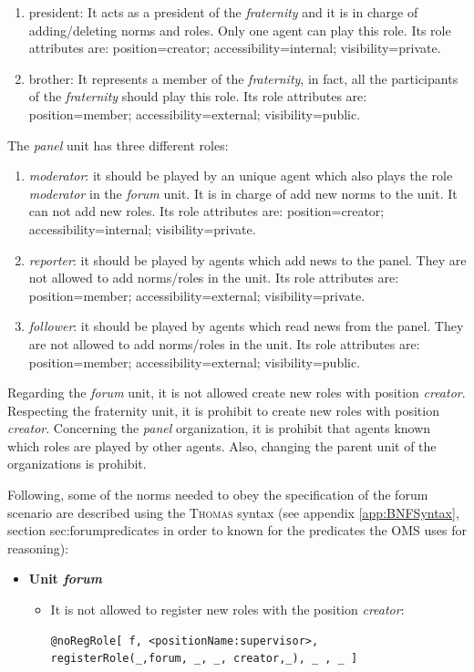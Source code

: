 \begin{enumerate}
\begin{enumerate}
\item president: It acts as a president of the \textit{fraternity} and it is in  charge of adding/deleting norms and roles.  Only one agent can play this role. Its role attributes are: position=creator; accessibility=internal; visibility=private.
\item brother: It represents a member of the \textit{fraternity}, in fact, all the participants of the \textit{fraternity} should play this role.  Its role attributes are: position=member; accessibility=external; visibility=public.
\end{enumerate}

The \textit{panel} unit has three different roles:
\begin{enumerate}
\item \textit{moderator}: it should be played by an unique agent which also plays the role \textit{moderator} in the \textit{forum} unit. It is in charge of add new norms to the unit. It can not add new roles. Its role attributes are: position=creator; accessibility=internal; visibility=private.
\item \textit{reporter}: it should be played by agents which add news to the panel. They are not allowed to add norms/roles in the unit. Its role attributes are: position=member; accessibility=external; visibility=private.
\item \textit{follower}: it should be played by agents which read news from the panel.  They are not allowed to add norms/roles in the unit. Its role attributes are: position=member; accessibility=external; visibility=public.
\end{enumerate}

Regarding the \textit{forum} unit, it is not allowed create new roles with  position \textit{creator}.  Respecting the fraternity unit, it is prohibit to create new roles with position \textit{creator}. Concerning   the \textit{panel} organization, it is prohibit that agents known which roles are played by other agents. Also,  changing the parent unit of the organizations is prohibit.   

Following,  some of the norms needed to obey the specification of the forum scenario are described using the \textsc{Thomas} syntax (see appendix \ref{app:BNFSyntax}, section sec:forumpredicates in order to known for the predicates  the OMS uses for reasoning):
\begin{itemize}
\item \textbf{Unit \textit{forum}}
\begin{itemize}
\item It is not allowed to register new roles with the position \textit{creator}:
\begin{verbatim}
@noRegRole[ f, <positionName:supervisor>, 
registerRole(_,forum, _, _, creator,_), _ , _ ] 
\end{verbatim}


\end{itemize}
\end{itemize}
\end{enumerate}
